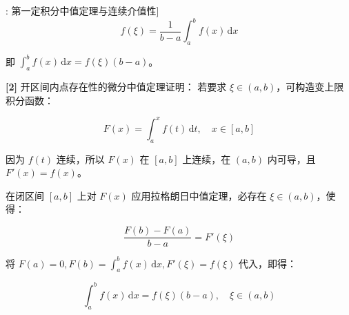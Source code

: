 \documentclass[11pt,a4paper,UTF8]{ctexart}
\begin{document}
\begin{thmbox}[定理[1]: 第一定积分中值定理与连续介值性]
\begin{equation*}
f(\xi) = \frac{1}{b-a}\int_a^b f(x)\,\mathrm{d}x
\end{equation*}


即 $\int_a^b f(x)\,\mathrm{d}x = f(\xi)(b-a)$。

\textbf{[2]} 开区间内点存在性的微分中值定理证明：
若要求 $\xi \in (a, b)$，可构造变上限积分函数：


\begin{equation*}
F(x) = \int_a^x f(t)\,\mathrm{d}t, \quad x \in [a, b]
\end{equation*}


因为 $f(t)$ 连续，所以 $F(x)$ 在 $[a, b]$ 上连续，在 $(a, b)$ 内可导，且 $F'(x) = f(x)$。

在闭区间 $[a, b]$ 上对 $F(x)$ 应用拉格朗日中值定理，必存在 $\xi \in (a, b)$，使得：


\begin{equation*}
\frac{F(b) - F(a)}{b - a} = F'(\xi)
\end{equation*}


将 $F(a) = 0, F(b) = \int_a^b f(x)\,\mathrm{d}x, F'(\xi) = f(\xi)$ 代入，即得：


\begin{equation*}
\int_a^b f(x)\,\mathrm{d}x = f(\xi)(b-a), \quad \xi \in (a, b)
\end{equation*}


\end{thmbox}
\end{document}
